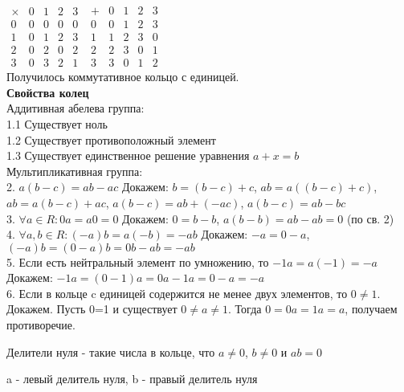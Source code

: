 $\begin{matrix}
\times&0&1&2&3\\0&0&0&0&0\\1&0&1&2&3\\2&0&2&0&2\\3&0&3&2&1
\end{matrix}$ \quad $\begin{matrix}
+&0&1&2&3\\0&0&1&2&3\\1&1&2&3&0\\2&2&3&0&1\\3&3&0&1&2
\end{matrix}$\\
Получилось коммутативное кольцо с единицей.\\

\textbf{Свойства колец}\\
Аддитивная абелева группа:\\
1.1 Существует ноль\\
1.2 Существует противоположный элемент\\
1.3 Существует единственное решение уравнения $a+x=b$\\
Мультипликативная группа:\\
2. $a(b-c)=ab-ac$ Докажем: $b=(b-c)+c$, $ab=a((b-c)+c)$, $ab=a(b-c)+ac$,
$a(b-c)=ab+(-ac)$, $a(b-c)=ab-bc$\\
3. $\forall a\in R: 0a=a0=0$ Докажем: $0=b-b$, $a(b-b)=ab-ab=0$ (по св. 2)\\
4. $\forall a,b\in R: (-a)b=a(-b)=-ab$ Докажем: $-a=0-a$, 
$(-a)b=(0-a)b=0b-ab=-ab$\\
5. Если есть нейтральный элемент по умножению, то $-1a=a(-1)=-a$ Докажем:
$-1a=(0-1)a=0a-1a=0-a=-a$\\
6. Если в кольце c единицей содержится не менее двух элементов, то $0\ne1$. 
Докажем. Пусть 0=1 и существует $0\ne a\ne1$. Тогда $0=0a=1a=a$, получаем 
противоречие.
\begin{defin}
Делители нуля - такие числа в кольце, что $a\ne0$, $b\ne0$ и $ab=0$
\end{defin}
a - левый делитель нуля, b - правый делитель нуля\\
